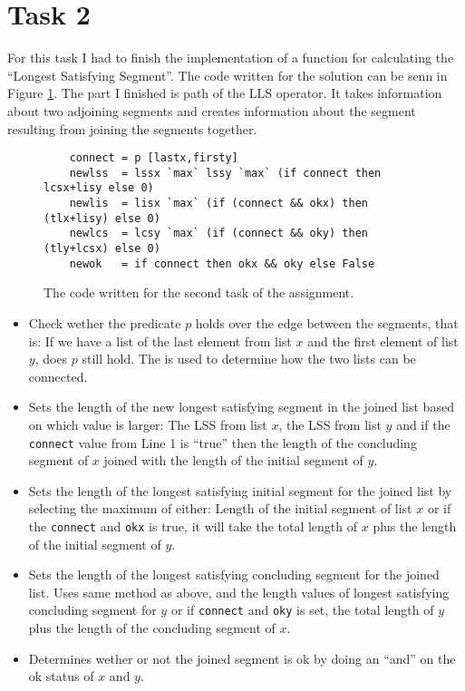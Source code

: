 \section{Task 2}

For this task I had to finish the implementation of a function for calculating
the ``Longest Satisfying Segment''. The code written for the solution can be
senn in Figure \ref{fig:t2code}. The part I finished is path of the LLS
operator. It takes information about two adjoining segments and creates
information about the segment resulting from joining the segments together.

\begin{figure}[ht]
    \begin{lstlisting}
    connect = p [lastx,firsty]
    newlss  = lssx `max` lssy `max` (if connect then lcsx+lisy else 0)
    newlis  = lisx `max` (if (connect && okx) then (tlx+lisy) else 0)
    newlcs  = lcsy `max` (if (connect && oky) then (tly+lcsx) else 0)
    newok   = if connect then okx && oky else False
    \end{lstlisting}
    \caption{The code written for the second task of the assignment.}
    \label{fig:t2code}
\end{figure}

\begin{itemize}
    \item[Line 1] Check wether the predicate $p$ holds over the edge between the
    segments, that is: If we have a list of the last element from list $x$ and
    the first element of list $y$, does $p$ still hold. The is used to determine
    how the two lists can be connected.

    \item[Line 2] Sets the length of the new longest satisfying segment in the
    joined list based on which value is larger: The LSS from list $x$, the LSS
    from list $y$ and if the \texttt{connect} value from Line 1 is ``true'' then
    the length of the concluding segment of $x$ joined with the length of the
    initial segment of $y$.

    \item[Line 3] Sets the length of the longest satisfying initial segment for
    the joined list by selecting the maximum of either: Length of the initial
    segment of list $x$ or if the \texttt{connect} and \texttt{okx} is true, it
    will take the total length of $x$ plus the length of the initial segment of
    $y$.

    \item[Line 4] Sets the length of the longest satisfying concluding segment
    for the joined list. Uses same method as above, and the length values of
    longest satisfying concluding segment for $y$ or if \texttt{connect} and
    \texttt{oky} is set, the total length of $y$ plus the length of the
    concluding segment of $x$.

    \item[Line 5] Determines wether or not the joined segment is ok by doing an
    ``and'' on the ok status of $x$ and $y$.
\end{itemize}
